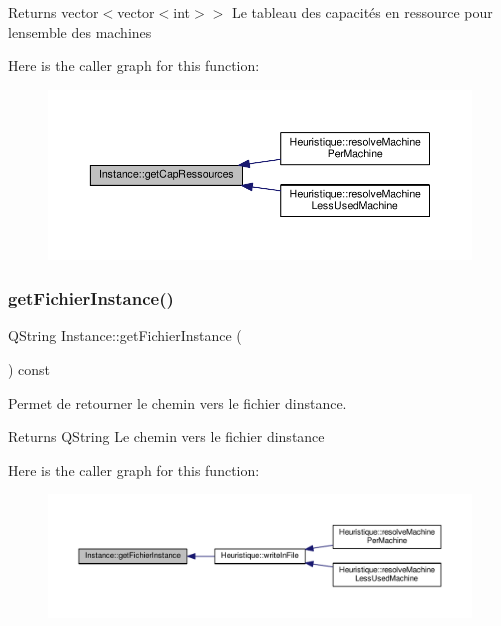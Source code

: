\begin{DoxyReturn}{Returns}
vector$<$vector$<$int$>$$>$ Le tableau des capacités en ressource pour l\textquotesingle{}ensemble des machines 
\end{DoxyReturn}
Here is the caller graph for this function\+:\nopagebreak
\begin{figure}[H]
\begin{center}
\leavevmode
\includegraphics[width=350pt]{classInstance_a98fcba260003717a635cec8fee3c3a27_icgraph}
\end{center}
\end{figure}
\mbox{\label{classInstance_a783365375cdab53149f87208374331a7}} 
\subsubsection{\texorpdfstring{get\+Fichier\+Instance()}{getFichierInstance()}}
{\footnotesize\ttfamily Q\+String Instance\+::get\+Fichier\+Instance (\begin{DoxyParamCaption}{ }\end{DoxyParamCaption}) const}



Permet de retourner le chemin vers le fichier d\textquotesingle{}instance. 

\begin{DoxyReturn}{Returns}
Q\+String Le chemin vers le fichier d\textquotesingle{}instance 
\end{DoxyReturn}
Here is the caller graph for this function\+:\nopagebreak
\begin{figure}[H]
\begin{center}
\leavevmode
\includegraphics[width=350pt]{classInstance_a783365375cdab53149f87208374331a7_icgraph}
\end{center}
\end{figure}
\mbox{\label{classInstance_aaf335b7258a7db93b8912f2853133620}} 

